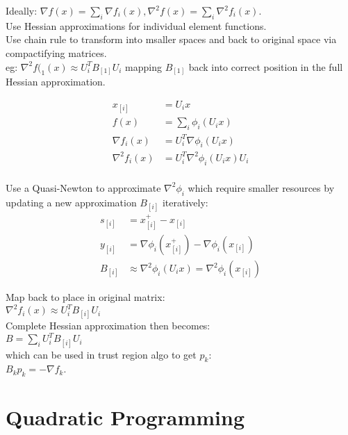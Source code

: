 \documentclass[8pt,letter]{article}
\begin{document}
\begin{multicols*}{2}
  Ideally: $\nabla f(x) = \sum_i \nabla f_i(x), \nabla^2 f(x) = \sum_i \nabla^2 f_i(x)$.\\

  Use Hessian approximations for individual element functions.\\ 

  Use chain rule to transform into msaller spaces and back to original space via compactifying matrices.\\

  eg: $\nabla^2 f(_1(x) \approx U_i^T B_{[1]} U_i$ mapping $B_{[1]}$ back into correct position in the full Hessian approximation.

  \begin{align*}
    x_{[i]} &= U_i x\\
    f(x) &= \sum_i \phi_i(U_i x)\\
    \nabla f_i(x) &= U_i^T \nabla \phi_i(U_i x)\\
    \nabla^2 f_i(x) &= U_i^T \nabla^2 \phi_i(U_i x) U_i\\
  \end{align*}

  Use a Quasi-Newton to approximate $\nabla^2 \phi_i$ which require smaller resources by updating a new approximation $B_{[i]}$ iteratively:
  \begin{align*}
    s_{[i]} & = x_{[i]}^+ - x_{[i]}\\
    y_{[i]} & = \nabla \phi_i(x_{[i]}^+) - \nabla \phi_i(x_{[i]})\\
    B_{[i]} & \approx \nabla^2 \phi_i(U_i x) = \nabla^2 \phi_i(x_{[i]})
  \end{align*}

  Map back to place in original matrix:\\

  $\nabla^2 f_i(x) \approx U_i^T B_{[i]} U_i$\\

  Complete Hessian approximation then becomes:\\

  $B = \sum_i U_i^T B_{[i]} U_i$\\

  which can be used in trust region algo to get $p_k$:\\
  
  $B_k p_k = -\nabla f_k$.

  \vfill\null
  \pagebreak

  \section{Quadratic Programming}


\end{multicols*}
\end{document}
